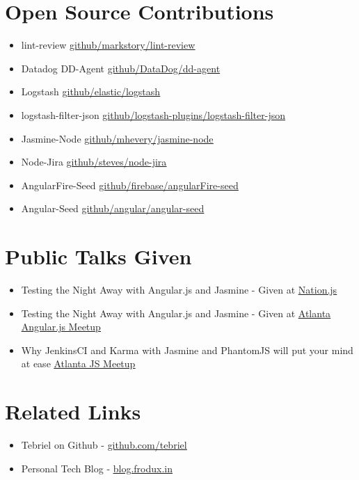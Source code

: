 \documentclass[margin]{res}
\begin{document}
\begin{resume}
\section{Open Source Contributions}
    \begin{itemize}
        \item lint-review
            \href{https://github.com/markstory/lint-review}{\underline{github/markstory/lint-review}}
        \item Datadog DD-Agent
            \href{https://github.com/DataDog/dd-agent}{\underline{github/DataDog/dd-agent}}
        \item Logstash
            \href{https://github.com/elastic/logstash}{\underline{github/elastic/logstash}}
        \item logstash-filter-json
            \href{https://github.com/logstash-plugins/logstash-filter-json}{\underline{github/logstash-plugins/logstash-filter-json}}
        \item Jasmine-Node
            \href{https://github.com/mhevery/jasmine-node}{\underline{github/mhevery/jasmine-node}}
        \item Node-Jira
            \href{https://github.com/steves/node-jira}{\underline{github/steves/node-jira}}
        \item AngularFire-Seed
            \href{https://github.com/firebase/angularFire-seed}{\underline{github/firebase/angularFire-seed}}
        \item Angular-Seed
            \href{https://github.com/angular/angular-seed}{\underline{github/angular/angular-seed}}
    \end{itemize}

\section{Public Talks Given}
    \begin{itemize}
        \item Testing the Night Away with Angular.js and Jasmine - Given at
            \href{http://nationjs.com/}{\underline{Nation.js}}
        \item Testing the Night Away with Angular.js and Jasmine - Given at
            \href{http://www.meetup.com/AngularJS-ATL/}{\underline{Atlanta
            Angular.js Meetup}}
        \item Why JenkinsCI and Karma with Jasmine and PhantomJS will put your
            mind at ease
            \href{http://www.meetup.com/AtlantaJavaScript/}{\underline{Atlanta
            JS Meetup}}
    \end{itemize}

\section{Related Links}
    \begin{itemize}
        \item Tebriel on Github - \href{https://github.com/tebriel}{\underline{github.com/tebriel}}
        \item Personal Tech Blog - \href{http://blog.frodux.in/}{\underline{blog.frodux.in}}
    \end{itemize}

\end{resume}
\end{document}
